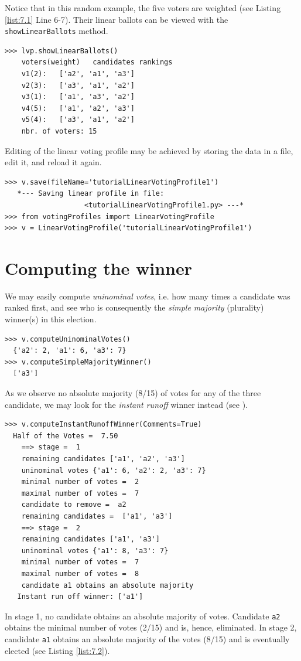 Notice that in this random example, the five voters are weighted (see Listing \ref{list:7.1} Line 6-7). Their linear ballots can be viewed with the \texttt{showLinearBallots} method.
\begin{lstlisting}
>>> lvp.showLinearBallots()
    voters(weight)	 candidates rankings
    v1(2): 	 ['a2', 'a1', 'a3']
    v2(3): 	 ['a3', 'a1', 'a2']
    v3(1): 	 ['a1', 'a3', 'a2']
    v4(5): 	 ['a1', 'a2', 'a3']
    v5(4): 	 ['a3', 'a1', 'a2']
    nbr. of voters: 15
\end{lstlisting}

Editing of the linear voting profile may be achieved by storing the data in a file, edit it, and reload it again.
\begin{lstlisting}
>>> v.save(fileName='tutorialLinearVotingProfile1')
   *--- Saving linear profile in file:
                   <tutorialLinearVotingProfile1.py> ---*
>>> from votingProfiles import LinearVotingProfile
>>> v = LinearVotingProfile('tutorialLinearVotingProfile1')
\end{lstlisting}

\section{Computing the winner}
\label{sec:7.2}

We may easily compute \emph{uninominal votes}, i.e. how many times a candidate was ranked first, and see who is consequently the \emph{simple majority} (plurality) winner(s) in this election.
\begin{lstlisting}
>>> v.computeUninominalVotes()
  {'a2': 2, 'a1': 6, 'a3': 7}
>>> v.computeSimpleMajorityWinner()
  ['a3']
\end{lstlisting}

As we observe no absolute majority (8/15) of votes for any of the three candidate, we may look for the \emph{instant runoff} winner instead (see \citet{ADT-L2}).
\begin{lstlisting}[caption={Example Instant Run Off Winner},label=list:7.2]
>>> v.computeInstantRunoffWinner(Comments=True)
  Half of the Votes =  7.50
    ==> stage =  1
	remaining candidates ['a1', 'a2', 'a3']
	uninominal votes {'a1': 6, 'a2': 2, 'a3': 7}
	minimal number of votes =  2
	maximal number of votes =  7
	candidate to remove =  a2
	remaining candidates =  ['a1', 'a3']
    ==> stage =  2
	remaining candidates ['a1', 'a3']
	uninominal votes {'a1': 8, 'a3': 7}
	minimal number of votes =  7
	maximal number of votes =  8
	candidate a1 obtains an absolute majority
   Instant run off winner: ['a1']
 \end{lstlisting}
In stage 1, no candidate obtains an absolute majority of votes. Candidate \texttt{a2} obtains the minimal number of votes (2/15) and is, hence, eliminated. In stage 2, candidate \texttt{a1} obtains an absolute majority of the votes (8/15) and is eventually elected (see Listing \ref{list:7.2}).

